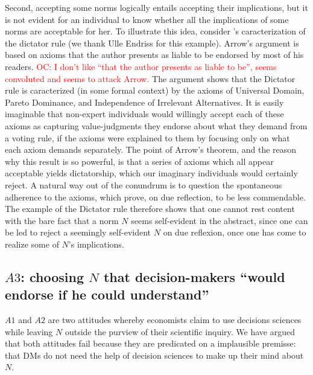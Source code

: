 \documentclass[preprint, french, english, 11pt, authoryear]{elsarticle}%
\newcommand{\protectforpdf}[1]{\texorpdfstring{\ensuremath{#1}}{#1}}
\newcommand{\commentOC}[1]{\textcolor{red}{OC: #1}}
\begin{document}
Second, accepting some norms logically entails accepting their implications, but it is not evident for an individual to know whether all the implications of some norms are acceptable for her. To illustrate this idea, consider \citeauthor{arrow_social_2012}’s \citeyearpar{arrow_social_2012} caracterization of the dictator rule (we thank Ulle Endriss for this example). Arrow's argument is based on axioms that the author presents as liable to be endorsed by most of his readers. \commentOC{I don’t like “that the author presents as liable to be”, seems convoluted and seems to attack Arrow.} The argument shows that the Dictator rule is caracterized (in some formal context) by the axioms of Universal Domain, Pareto Dominance, and Independence of Irrelevant Alternatives. It is easily imaginable that non-expert individuals would willingly accept each of these axioms as capturing value-judgments they endorse about what they demand from a voting rule, if the axioms were explained to them by focusing only on what each axiom demands separately. The point of Arrow's theorem, and the reason why this result is so powerful, is that a series of axioms which all appear acceptable yields dictatorship, which our imaginary individuals would certainly reject. A natural way out of the conundrum is to question the spontaneous adherence to the axioms, which prove, on due reflection, to be less commendable. The example of the Dictator rule therefore shows that one cannot rest content with the bare fact that a norm $N$ seems self-evident in the abstract, since one can be led to reject a seemingly self-evident $N$ on due reflexion, once one has come to realize some of $N$'s implications.

\subsection{\protectforpdf{A3}: choosing \protectforpdf{N} that decision-makers ``would endorse if he could understand''}
$A1$ and $A2$ are two attitudes whereby economists claim to use decisions sciences while leaving $N$ outside the purview of their scientific inquiry. We have argued that both attitudes fail because they are predicated on a implausible premisse: that \acp{DM} do not need the help of decision sciences to make up their mind about $N$.
\end{document}

